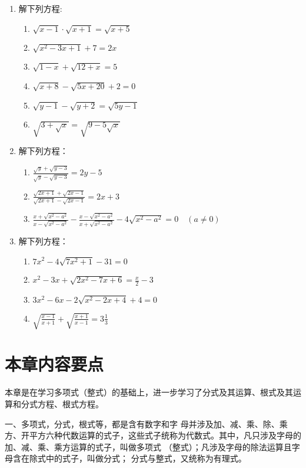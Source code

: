 \begin{enumerate}
\item 解下列方程:
\begin{multicols}{2}
    \begin{enumerate}
\item $\sqrt{x-1} \cdot \sqrt{x+1}=\sqrt{x+5}$
\item $\sqrt{x^{2}-3 x+1}+7=2 x$
\item $\sqrt{1-x}+\sqrt{12+x}=5$
\item $\sqrt{x+8}-\sqrt{5 x+20}+2=0$
\item $\sqrt{y-1}-\sqrt{y+2}=\sqrt{5 y-1}$
\item $\sqrt{3+\sqrt{x}}=\sqrt{9-5 \sqrt{x}}$
\end{enumerate}
\end{multicols}



\item 解下列方程：
\begin{enumerate}
\item $\frac{\sqrt{y}+\sqrt{y-3}}{\sqrt{y}-\sqrt{y-3}}=2 y-5$
\item $\frac{\sqrt{2 x+1}+\sqrt{2 x-1}}{\sqrt{2 x+1}-\sqrt{2 x-1}}=2 x+3$ 
\item  $\frac{x+\sqrt{x^{2}-a^{2}}}{x-\sqrt{x^{2}-a^{2}}}-\frac{x-\sqrt{x^{2}-a^{2}}}{x+\sqrt{x^{2}-a^{2}}}-4 \sqrt{x^{2}-a^{2}}=0\quad (a \neq 0)$
\end{enumerate}

\item 解下列方程：
\begin{enumerate}
\item  $7 x^{2}-4 \sqrt{7 x^{2}+1}-31=0$
\item  $x^{2}-3 x+\sqrt{2 x^{2}-7 x+6}=\frac{x}{2}-3$ 
\item $3 x^{2}-6 x-2 \sqrt{x^{2}-2 x+4}+4=0$
\item  $\sqrt{\frac{x-1}{x+1}}+\sqrt{\frac{x+1}{x-1}}=3 \frac{1}{3}$
\end{enumerate}

\end{enumerate}


\section*{本章内容要点}

本章是在学习多项式（整式）的基础上，进一步学习了分式及其运算、根式及其运算和分式方程、根式方程。

一、多项式，分式，根式等，都是含有数字和字
母并涉及加、减、乘、除、乘方、开平方六种代数运算的式子，这些式子统称为代数式。其中，凡只涉及字母的加、减、乘、乘方运算的式子，叫做多项式
（整式）；凡涉及字母的除法运算且字母含在除式中的式子，叫做分式；
分式与整式，又统称为有理式。

